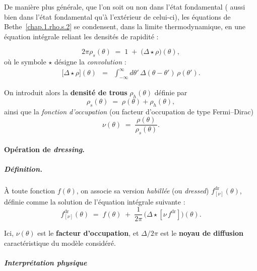 \smallskip 

De manière plus générale, que l’on soit ou non dans l’état fondamental (\ie{} aussi bien dans l’état fondamental qu’à l’extérieur de celui-ci), les équations de Bethe~\eqref{chap.1.rho.s.2} se condensent, dans la limite thermodynamique, en une équation intégrale reliant les densités de rapidité :


\begin{equation}\label{eq:TBA-rhos}
	2\pi \rho_s(\theta) \;=\; 1 \;+\; \bigl(\Delta \star \rho\bigr)(\theta),
\end{equation}
où le symbole $\star$ désigne la \emph{convolution} :
\begin{eqnarray*}
	\bigl[\Delta \star \rho\bigr](\theta) & = &  \int_{-\infty}^{\infty} d\theta'\, \Delta(\theta - \theta')\, \rho(\theta').
\end{eqnarray*}

On introduit alors la \textbf{densité de trous} $\rho_h(\theta)$ définie par
\begin{equation}
	\rho_s(\theta) \;=\; \rho(\theta) + \rho_h(\theta),
\end{equation}
ainsi que la \emph{fonction d’occupation} (ou facteur d’occupation de type Fermi–Dirac)
\begin{equation}\label{eq:TBA-nu}
	\nu(\theta) \;=\; \frac{\rho(\theta)}{\rho_s(\theta)}.
\end{equation}

\paragraph{Opération de \emph{dressing}.}

\subparagraph{Définition.}  
À toute fonction $f(\theta)$, on associe sa version \emph{habillée} (ou \emph{dressed}) $f^{\mathrm{dr}}_{[\nu]}(\theta)$, définie comme la solution de l’équation intégrale suivante :
\begin{equation}\label{eq:dressing}
	f^{\mathrm{dr}}_{[\nu]}(\theta) 
	\;=\; f(\theta) \;+\; \frac{1}{2\pi}\,\bigl(\Delta \star [\nu\, f^{\mathrm{dr}}]\bigr)(\theta).
\end{equation}

Ici, $\nu(\theta)$ est le \textbf{facteur d’occupation}, et $\Delta/2\pi$ est le \textbf{noyau de diffusion} caractéristique du modèle considéré.  

\medskip

\subparagraph{Interprétation physique}

